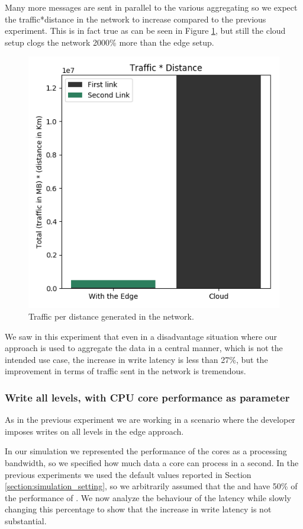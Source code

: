 Many more messages are sent in parallel to the various aggregating  so we expect the traffic*distance in the network to increase compared to the previous experiment. This is in fact true as can be seen in Figure \ref{fig:write-all-traffic1}, but still the cloud setup clogs the network 2000\% more than the edge setup.

\begin{figure}[H]
    \centering
    \includegraphics[width=0.75\linewidth]{Figures/Evaluation/write-all-traffic1.png}
    \caption{Traffic per distance generated in the network.}
    \label{fig:write-all-traffic1}
\end{figure}

We saw in this experiment that even in a disadvantage situation where our approach is used to aggregate the data in a central manner, which is not the intended use case, the increase in write latency is less than 27\%, but the improvement in terms of traffic sent in the network is tremendous.


\subsubsection{Write all levels, with CPU core performance as parameter}
As in the previous experiment we are working in a scenario where the developer imposes writes on all levels in the edge approach.

In our simulation we represented the performance of the cores as a processing bandwidth, so we specified how much data a core can process in a second. In the previous experiments we used the default values reported in Section \ref{section:simulation_setting}, so we arbitrarily assumed that the  and  have 50\% of the performance of . We now analyze the behaviour of the latency while slowly changing this percentage to show that the increase in write latency is not substantial.

